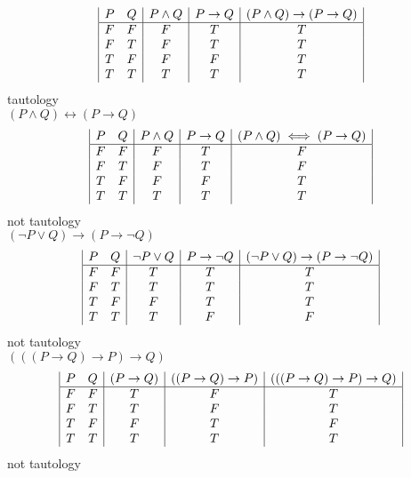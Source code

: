 \documentclass[a4paper,12pt]{article}
\begin{document}
\begin{displaymath}
\begin {array} {|c c |c|c|c|}
P & Q & P \wedge Q &P \rightarrow Q & (P \wedge Q) \rightarrow (P \rightarrow Q)\\
\hline
F & F & F & T & T \\
F & T & F & T & T \\
T & F & F & F & T \\
T & T & T & T & T \\
\end{array}
\end{displaymath}
tautology\\
$(P \wedge Q) \leftrightarrow (P \rightarrow Q)$\\
\begin{displaymath}
\begin {array} {|c c |c|c|c|}
P & Q & P \wedge Q &P \rightarrow Q & (P \wedge Q) \iff (P \rightarrow Q)\\
\hline
F & F & F & T & F \\
F & T & F & T & F \\
T & F & F & F & T \\
T & T & T & T & T \\

\end{array}
\end{displaymath}
not tautology\\

$(\lnot P \vee Q) \rightarrow (P \rightarrow \lnot Q)$\\
\begin{displaymath}
\begin {array} {|c c |c|c|c|}
P & Q & \lnot P \vee Q &P \rightarrow \lnot Q
&(\lnot P \vee Q) \rightarrow (P \rightarrow \lnot Q)\\
\hline
F & F & T & T & T \\
F & T & T & T & T \\
T & F & F & T & T \\
T & T & T & F & F \\ 
\end{array}
\end{displaymath} 
not tautology\\

$(((P \rightarrow Q) \rightarrow P) \rightarrow Q)$\\

\begin{displaymath}
\begin {array} {|c c |c|c|c|}
P & Q & (P \rightarrow Q) & ((P \rightarrow Q) \rightarrow P)
&(((P \rightarrow Q) \rightarrow P) \rightarrow Q)\\
\hline
F & F & T & F & T \\
F & T & T & F & T \\
T & F & F & T & F \\
T & T & T & T & T \\

\end{array}
\end{displaymath}
not tautology
\end{document}

